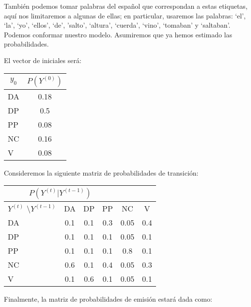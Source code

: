 También podemos tomar palabras del español que correspondan a estas etiquetas, aquí nos limitaremos a algunas de ellas; en particular, usaremos las palabras: `el', `la', `yo', `ellos', `de', 'salto', `altura', `cuerda', `vino', `tomaban' y `saltaban'. Podemos conformar nuestro modelo. Asumiremos que ya hemos estimado las probabilidades.

El vector de iniciales será:

\begin{center}
 \begin{tabular}{l|c}
  \multicolumn{1}{c|}{$y_0$}   &  $P(Y^{(0)})$ \\ \hline
  DA &    0.18 \\
  DP   &    0.5 \\
  PP    &    0.08 \\
  NC & 0.16 \\
  V &  0.08 \\
 \end{tabular}
 \end{center}

 Consideremos la siguiente matriz de probabilidades de transición:

 \begin{center}
 \begin{tabular}{l|ccccc}
  \multicolumn{4}{c}{$P(Y^{(t)}|Y^{(t-1)})$} \\ \hline
  $Y^{(t)}$ \textbackslash $Y^{(t-1)}$          & DA & DP & PP & NC & V \\ \hline
  DA & 0.1  & 0.1  & 0.3 & 0.05 & 0.4 \\
  DP & 0.1  & 0.1  & 0.1 & 0.05 & 0.1 \\
  PP & 0.1  & 0.1  & 0.1 & 0.8  & 0.1 \\
  NC & 0.6  & 0.1  & 0.4 & 0.05 & 0.3 \\
  V  & 0.1  & 0.6  & 0.1 & 0.05 & 0.1 \\
 \end{tabular}
 \end{center}


 Finalmente, la matriz de probabilidades de emisión estará dada como:

